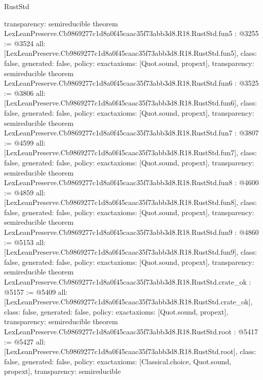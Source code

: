 \begin{lexlean}{RustStd}
\begin{coremodule}
{  transparency: semireducible
}
theorem LexLeanPreserve.Cb9869277c1d8a0f45caac35f73abb3d8.R18.RustStd.fun5 : @3255 := @3524 {
  all: [LexLeanPreserve.Cb9869277c1d8a0f45caac35f73abb3d8.R18.RustStd.fun5],
  class: false,
  generated: false,
  policy: exact{axioms: [Quot.sound, propext]},
  transparency: semireducible
}
theorem LexLeanPreserve.Cb9869277c1d8a0f45caac35f73abb3d8.R18.RustStd.fun6 : @3525 := @3806 {
  all: [LexLeanPreserve.Cb9869277c1d8a0f45caac35f73abb3d8.R18.RustStd.fun6],
  class: false,
  generated: false,
  policy: exact{axioms: [Quot.sound, propext]},
  transparency: semireducible
}
theorem LexLeanPreserve.Cb9869277c1d8a0f45caac35f73abb3d8.R18.RustStd.fun7 : @3807 := @4599 {
  all: [LexLeanPreserve.Cb9869277c1d8a0f45caac35f73abb3d8.R18.RustStd.fun7],
  class: false,
  generated: false,
  policy: exact{axioms: [Quot.sound, propext]},
  transparency: semireducible
}
theorem LexLeanPreserve.Cb9869277c1d8a0f45caac35f73abb3d8.R18.RustStd.fun8 : @4600 := @4859 {
  all: [LexLeanPreserve.Cb9869277c1d8a0f45caac35f73abb3d8.R18.RustStd.fun8],
  class: false,
  generated: false,
  policy: exact{axioms: [Quot.sound, propext]},
  transparency: semireducible
}
theorem LexLeanPreserve.Cb9869277c1d8a0f45caac35f73abb3d8.R18.RustStd.fun9 : @4860 := @5153 {
  all: [LexLeanPreserve.Cb9869277c1d8a0f45caac35f73abb3d8.R18.RustStd.fun9],
  class: false,
  generated: false,
  policy: exact{axioms: [Quot.sound, propext]},
  transparency: semireducible
}
theorem LexLeanPreserve.Cb9869277c1d8a0f45caac35f73abb3d8.R18.RustStd.crate_ok : @5157 := @5409 {
  all: [LexLeanPreserve.Cb9869277c1d8a0f45caac35f73abb3d8.R18.RustStd.crate_ok],
  class: false,
  generated: false,
  policy: exact{axioms: [Quot.sound, propext]},
  transparency: semireducible
}
theorem LexLeanPreserve.Cb9869277c1d8a0f45caac35f73abb3d8.R18.RustStd.root : @5417 := @5427 {
  all: [LexLeanPreserve.Cb9869277c1d8a0f45caac35f73abb3d8.R18.RustStd.root],
  class: false,
  generated: false,
  policy: exact{axioms: [Classical.choice, Quot.sound, propext]},
  transparency: semireducible
}


\end{coremodule}
\end{lexlean}
